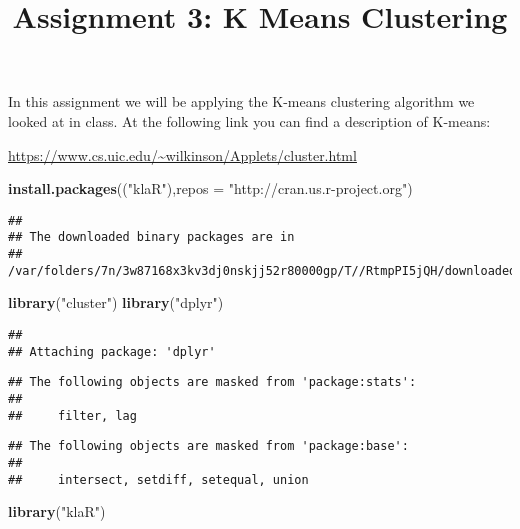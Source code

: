 \documentclass[]{article}
\title{Assignment 3: K Means Clustering}
\author{}
\date{}
\newenvironment{Shaded}{\begin{snugshade}}{\end{snugshade}}
\newcommand{\DataTypeTok}[1]{\textcolor[rgb]{0.13,0.29,0.53}{#1}}
\newcommand{\KeywordTok}[1]{\textcolor[rgb]{0.13,0.29,0.53}{\textbf{#1}}}
\newcommand{\NormalTok}[1]{#1}
\newcommand{\StringTok}[1]{\textcolor[rgb]{0.31,0.60,0.02}{#1}}
\begin{document}
\maketitle

In this assignment we will be applying the K-means clustering algorithm
we looked at in class. At the following link you can find a description
of K-means:

\url{https://www.cs.uic.edu/~wilkinson/Applets/cluster.html}

\begin{Shaded}
\begin{Highlighting}[]
\KeywordTok{install.packages}\NormalTok{((}\StringTok{"klaR"}\NormalTok{),}\DataTypeTok{repos =} \StringTok{"http://cran.us.r-project.org"}\NormalTok{)}
\end{Highlighting}
\end{Shaded}

\begin{verbatim}
## 
## The downloaded binary packages are in
##  /var/folders/7n/3w87168x3kv3dj0nskjj52r80000gp/T//RtmpPI5jQH/downloaded_packages
\end{verbatim}

\begin{Shaded}
\begin{Highlighting}[]
\KeywordTok{library}\NormalTok{(}\StringTok{"cluster"}\NormalTok{)}
\KeywordTok{library}\NormalTok{(}\StringTok{"dplyr"}\NormalTok{)}
\end{Highlighting}
\end{Shaded}

\begin{verbatim}
## 
## Attaching package: 'dplyr'
\end{verbatim}

\begin{verbatim}
## The following objects are masked from 'package:stats':
## 
##     filter, lag
\end{verbatim}

\begin{verbatim}
## The following objects are masked from 'package:base':
## 
##     intersect, setdiff, setequal, union
\end{verbatim}

\begin{Shaded}
\begin{Highlighting}[]
\KeywordTok{library}\NormalTok{(}\StringTok{"klaR"}\NormalTok{)}
\end{Highlighting}
\end{Shaded}
\end{document}
